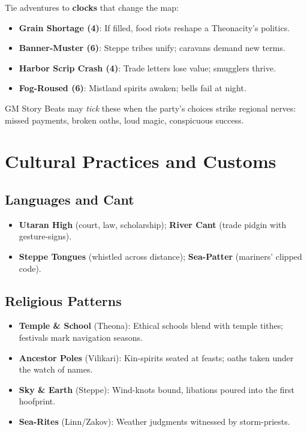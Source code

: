 Tie adventures to \textbf{clocks} that change the map:

\begin{itemize}
\item \textbf{Grain Shortage (4)}: If filled, food riots reshape a Theonacity's politics.
\item \textbf{Banner-Muster (6)}: Steppe tribes unify; caravans demand new terms.
\item \textbf{Harbor Scrip Crash (4)}: Trade letters lose value; smugglers thrive.
\item \textbf{Fog-Roused (6)}: Mistland spirits awaken; bells fail at night.
\end{itemize}

\smallskip
\noindent GM Story Beats may \emph{tick} these when the party's choices strike regional nerves: missed payments, broken oaths, loud magic, conspicuous success.

\section{Cultural Practices and Customs}

\subsection*{Languages and Cant}
\begin{itemize}
\item \textbf{Utaran High} (court, law, scholarship); \textbf{River Cant} (trade pidgin with gesture-signs).
\item \textbf{Steppe Tongues} (whistled across distance); \textbf{Sea-Patter} (mariners' clipped code).
\end{itemize}

\subsection*{Religious Patterns}
\begin{itemize}
\item \textbf{Temple \& School} (Theona): Ethical schools blend with temple tithes; festivals mark navigation seasons.
\item \textbf{Ancestor Poles} (Vilikari): Kin-spirits seated at feasts; oaths taken under the watch of names.
\item \textbf{Sky \& Earth} (Steppe): Wind-knots bound, libations poured into the first hoofprint.
\item \textbf{Sea-Rites} (Linn/Zakov): Weather judgments witnessed by storm-priests.
\end{itemize}

